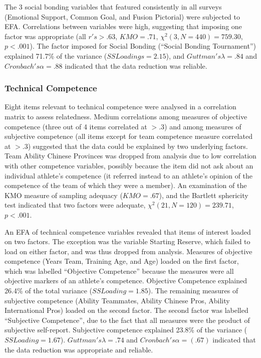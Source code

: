 \begin{CJK}{UTF8}{gbsn}
The 3 social bonding variables that featured consistently in all surveys (Emotional Support, Common Goal, and Fusion Pictorial) were subjected to EFA.  Correlations between variables were high, suggesting that imposing one factor was appropriate (all $r's > .63$, $KMO = .71$, $\chi^2(3, N = 440) =  759.30$, $p < .001$).  The factor imposed for Social Bonding (``Social Bonding Tournament'') explained 71.7\% of the variance ($SS Loadings =  2.15$), and $Guttman's \lambda =.84$ and $Cronbach's \alpha= .88$ indicated that the data reduction was reliable.


\subsubsection{Technical Competence}
Eight items relevant to technical competence were analysed in a correlation matrix to assess relatedness.  Medium correlations among measures of objective competence (three out of 4 items correlated at $> .3$) and among measures of subjective competence (all items except for team competence measure correlated at $> .3$) suggested that the data could be explained by two underlying factors. Team Ability Chinese Provinces was dropped from analysis due to low correlation with other competence variables, possibly because the item did not ask about an individual athlete's competence (it referred instead to an athlete's opinion of the competence of the team of which they were a member). An examination of the KMO measure of sampling adequacy ($KMO = .67$), and the Bartlett sphericity test indicated that two factors were adequate, $\chi^2(21, N = 120) = 239.71$, $p < .001$.

An EFA of technical competence variables revealed that items of interest loaded on two factors. The exception was the variable Starting Reserve, which failed to load on either factor, and was thus dropped from analysis. Measures of objective competence (Years Team, Training Age, and Age) loaded on the first factor, which was labelled ``Objective Competence'' because the measures were all objective markers of an athlete's competence.  Objective Competence explained 26.4\% of the total variance ($SS Loading = 1.85$). The remaining measures of subjective competence (Ability Teammates, Ability Chinese Pros, Ability International Pros) loaded on the second factor.  The second factor was labelled ``Subjective Competence'', due to the fact that all measures were the product of subjective self-report.  Subjective competence explained 23.8\% of the variance ($SS Loading = 1.67$). $Guttman's \lambda =.74$ and $Cronbach's \alpha = (.67)$ indicated that the data reduction was appropriate and reliable.


\end{CJK}
